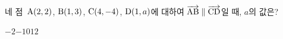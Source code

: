 네 점~$\mathrm{A}(2{,}\mkern3mu\mathopen{}2)$, $\mathrm{B}(1{,}\mkern3mu\mathopen{}3)$, $\mathrm{C}(4{,}\mkern3mu\mathopen{}-4)$, $\mathrm{D}(1{,}\mkern3mu\mathopen{}a)$에 대하여 $\overrightarrow{\mathrm{AB}}\parallel\overrightarrow{\mathrm{CD}}$일 때, $a$의 값은?
\begin{choices32}{$-2$}{$-1$}{$0$}{$1$}{$2$}\end{choices32}
